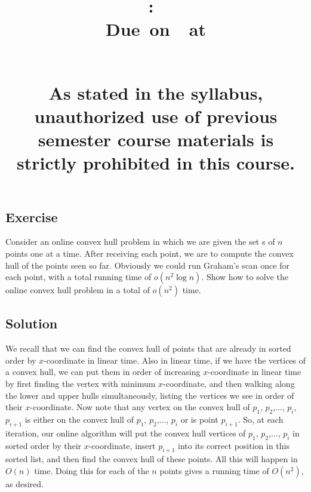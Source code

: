 \documentclass{article}
\title{
    \vspace{2in}
    \textbf{\hmwkClass:\ \hmwkTitle}\\
    \normalsize\vspace{0.1in}\small{Due\ on\ \hmwkDueDate\ at \hmwkDueTime}\\
    \vspace{0.1in}\large{\textit{\hmwkClassInstructor\ \hmwkSection}} \\
    \vspace{0.8in}
    \begin{minipage}[t]{0.4\columnwidth}
        {\footnotesize\textbf{As stated in the syllabus, unauthorized use of previous semester course materials is strictly prohibited in this course.
        }}
    \vspace{0.5in}
    \end{minipage}
    \vspace{0.8in}
    \author{\textbf{\hmwkAuthorName}}
    \date{}
}
\newcounter{counter}
\newcommand{\Exercise}{Exercise \stepcounter{counter}\thecounter}
\begin{document}
\maketitle
\pagebreak


\subsection*{\Exercise}
    Consider an online convex hull problem in which we are given the set s of $n$ points one at a time. After receiving each point, we are to compute the convex hull of the points seen so far. Obviously we could run Graham's scan once for each point, with a total running time of $o(n^2 \log n)$.  Show how to solve the online convex hull problem in a total of $o(n^2)$ time.

\subsection*{Solution}
    We recall that we can find the convex hull of points that are already in sorted order by $x$-coordinate in linear time. Also in linear time, if we have the vertices of a convex hull, we can put them in order of increasing $x$-coordinate in linear time by first finding the vertex with minimum $x$-coordinate, and then walking along the lower and upper hulls simultaneously, listing the vertices we see in order of their $x$-coordinate. Now note that any vertex on the convex hull of $p_1$, $p_2$,..., $p_i$, $p_{i+1}$ is either on the convex hull of $p_1$, $p_2$,..., $p_i$ or is point $p_{i+1}$. So, at each iteration, our online algorithm will put the convex hull vertices of $p_1$, $p_2$,..., $p_i$ in sorted order by their $x$-coordinate, insert $p_{i+1}$ into its correct position in this sorted list, and then find the convex hull of these points.  All this will happen in $O(n)$ time.  Doing this for each of the $n$ points gives a running time of $O(n^2)$, as desired.
\end{document}
